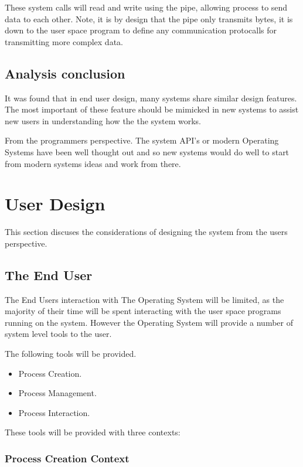 \documentclass[a4paper]{report}
\begin{document}
These system calls will read and write using the pipe, allowing process to send data to each other. Note, it is by design that the pipe only transmits bytes, it is down to the user space program to define any communication protocalls for transmitting more complex data.

\subsection*{Analysis conclusion}

It was found that in end user design, many systems share similar design features. The most important of these feature should be mimicked in new systems to assist new users in understanding how the the system works.

From the programmers perspective. The system API's or modern Operating Systems have been well thought out and so new systems would do well to start from modern systems ideas and work from there.


\clearpage
\section*{User Design}

This section discuses the considerations of designing the system from the users perspective.

\subsection*{The End User}

The End Users interaction with The Operating System will be limited, as the majority of their time will be spent interacting with the user space programs running on the system. However the Operating System will provide a number of system level tools to the user.

The following tools will be provided.
\begin{itemize}
\item Process Creation.
\item Process Management.
\item Process Interaction.
\end{itemize}

These tools will be provided with three contexts:

\subsubsection*{Process Creation Context}
\end{document}
